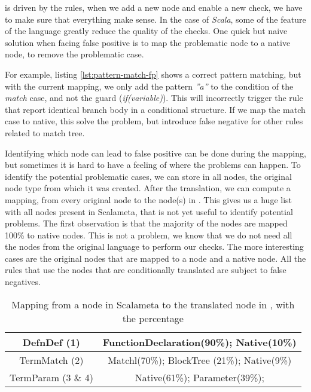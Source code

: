 \slang{} is driven by the rules, when we add a new node and enable a new check, we have to make sure that everything make sense. 
In the case of \emph{Scala}, some of the feature of the language greatly reduce the quality of the checks.
One quick but naive solution when facing false positive is to map the problematic node to a native node, to remove the problematic case.



For example, listing \ref{lst:pattern-match-fp} shows a correct pattern matching, but with the current mapping, we only add the pattern \emph{”a”} to the condition of the \emph{match} case, and not the guard (\emph{if(variable)}). 
This will incorrectly trigger the rule that report identical branch body in a conditional structure. 
If we map the match case to native, this solve the problem, but introduce false negative for other rules related to match tree.

Identifying \texttt{}which node can lead to false positive can be done during the mapping, but sometimes it is hard to have a feeling of where the problems can happen. 
To identify the potential problematic cases, we can store in all nodes, the original node type from which it was created. 
After the translation, we can compute a mapping, from every original node to the node(s) in \slang. 
This gives us a huge list with all nodes present in Scalameta, that is not yet useful to identify potential problems. 
The first observation is that the majority of the nodes are mapped 100\% to native nodes. This is not a problem, we know that we do not need all the nodes from the original language to perform our checks. 
The more interesting cases are the original nodes that are mapped to a \slang{} node and a native node. 
All the rules that use the nodes that are conditionally translated are subject to false negatives.

\begin{table}[h]
	\centering
	\caption{Mapping from a node in Scalameta to the translated node in \slang{}, with the percentage}
	\label{table:interesting_mapping}
	\begin{tabular}{|c|c|}
		\hline
		DefnDef (1) &  FunctionDeclaration(90\%); Native(10\%) \\ \hline
		TermMatch (2) &  Matchl(70\%); BlockTree (21\%); Native(9\%) \\ \hline
		TermParam (3 \& 4) & Native(61\%); Parameter(39\%); \\ \hline
	\end{tabular}
\end{table}

